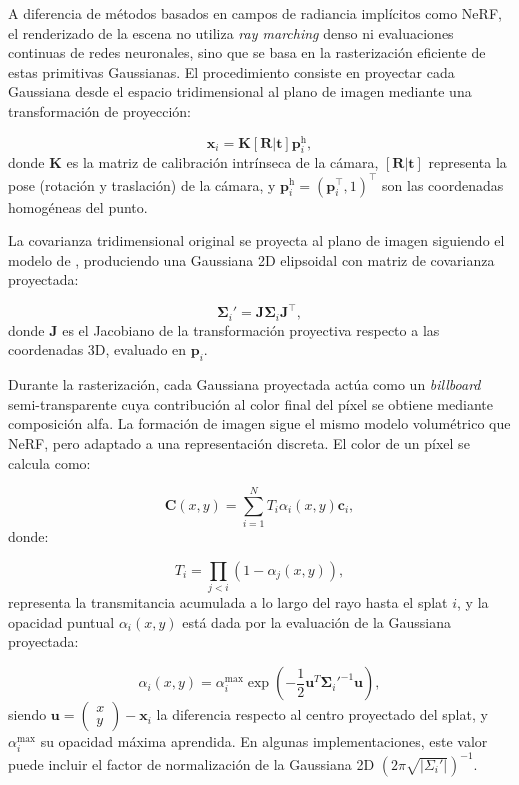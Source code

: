 A diferencia de métodos basados en campos de radiancia implícitos como NeRF, el renderizado de la escena no utiliza \textit{ray marching} denso ni evaluaciones continuas de redes neuronales, sino que se basa en la rasterización eficiente de estas primitivas Gaussianas. El procedimiento consiste en proyectar cada Gaussiana desde el espacio tridimensional al plano de imagen mediante una transformación de proyección:

\[
\mathbf{x}_i = \mathbf{K} [\mathbf{R} | \mathbf{t}] \mathbf{p}_i^{\text{h}},
\]
donde $\mathbf{K}$ es la matriz de calibración intrínseca de la cámara, $[\mathbf{R}|\mathbf{t}]$ representa la pose (rotación y traslación) de la cámara, y $\mathbf{p}_i^{\text{h}} = (\mathbf{p}_i^\top, 1)^\top$ son las coordenadas homogéneas del punto.

La covarianza tridimensional original se proyecta al plano de imagen siguiendo el modelo de \cite{zwicker2001ewa}, produciendo una Gaussiana 2D elipsoidal con matriz de covarianza proyectada:

\[
\mathbf{\Sigma}_i' = \mathbf{J} \mathbf{\Sigma}_i \mathbf{J}^\top,
\]
donde $\mathbf{J}$ es el Jacobiano de la transformación proyectiva respecto a las coordenadas 3D, evaluado en $\mathbf{p}_i$.

Durante la rasterización, cada Gaussiana proyectada actúa como un \textit{billboard} semi-transparente cuya contribución al color final del píxel se obtiene mediante composición alfa. La formación de imagen sigue el mismo modelo volumétrico que NeRF, pero adaptado a una representación discreta. El color de un píxel se calcula como:

\[
\mathbf{C}(x,y) = \sum_{i=1}^{N} T_i \alpha_i(x,y) \mathbf{c}_i,
\]
donde:

\[
T_i = \prod_{j<i} (1 - \alpha_j(x,y)),
\]
representa la transmitancia acumulada a lo largo del rayo hasta el splat $i$, y la opacidad puntual $\alpha_i(x,y)$ está dada por la evaluación de la Gaussiana proyectada:

\[
\alpha_i(x,y) = \alpha_{i}^{\max} \exp\left(-\frac{1}{2}\mathbf{u}^{T}\mathbf{\Sigma}_i'^{-1}\mathbf{u}\right),
\]
siendo $\mathbf{u} = \begin{pmatrix}x \\ y\end{pmatrix} - \mathbf{x}_i$ la diferencia respecto al centro proyectado del splat, y $\alpha_i^{\max}$ su opacidad máxima aprendida. En algunas implementaciones, este valor puede incluir el factor de normalización de la Gaussiana 2D $(2\pi \sqrt{|\Sigma_i'|})^{-1}$.

